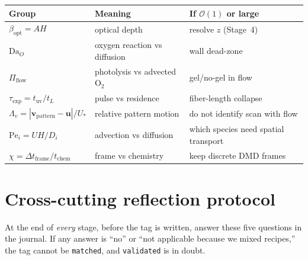 \documentclass[11pt,a4paper]{article}
\newcommand{\tagvalid}{\texttt{validated}}
\newcommand{\tagmatch}{\texttt{matched}}
\begin{document}
\begin{center}
\small
\begin{tabular}{@{}lll@{}}
\toprule
Group & Meaning & If $\mathcal{O}(1)$ or large \\
\midrule
$\beta_{\mathrm{opt}}=AH$ & optical depth & resolve $z$ (Stage~4) \\
$\mathrm{Da}_O$ & oxygen reaction vs diffusion & wall dead-zone \citep{Dendukuri2008} \\
$\Pi_{\mathrm{flow}}$ & photolysis vs advected $\mathrm{O}_2$ & gel/no-gel in flow \citep{Slutzky2019} \\
$\tau_{\mathrm{exp}}=t_{\mathrm{uv}}/t_L$ & pulse vs residence & fiber-length collapse \\
$\Lambda_v=|\mathbf{v}_{\mathrm{pattern}}-\mathbf{u}|/U_*$ & relative pattern motion & do not identify scan with flow \\
$\mathrm{Pe}_i=UH/D_i$ & advection vs diffusion & which species need spatial transport \\
$\chi=\Delta t_{\mathrm{frame}}/t_{\mathrm{chem}}$ & frame vs chemistry & keep discrete DMD frames \\
\bottomrule
\end{tabular}
\end{center}

\section{Cross-cutting reflection protocol}

At the end of \emph{every} stage, before the tag is written, answer these five questions in the journal.
If any answer is ``no'' or ``not applicable because we mixed recipes,'' the tag cannot be \tagmatch, and \tagvalid{} is in doubt.
\end{document}

